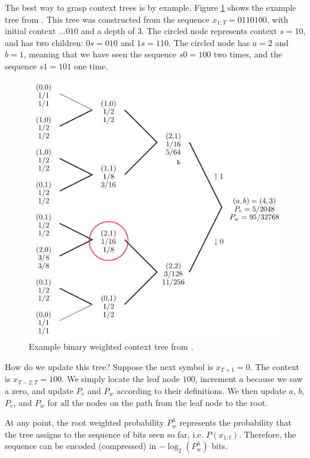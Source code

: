 \documentclass[11pt]{scrartcl}
\begin{document}
The best way to grasp context trees is by example. Figure \ref{fig:bin-tree}
shows the example tree from \textcite{eidma}. This tree was constructed from
the sequence $x_{1:T} = 0110100$, with initial context $...010$ and a depth of
3.  The circled node represents context $s = 10$, and has two children: $0s =
010$ and $1s = 110$. The circled node has $a = 2$ and $b = 1$, meaning that we
have seen the sequence $s0 = 100$ two times, and the sequence $s1 = 101$ one
time.

\begin{figure}[h!]
    \centering
    \includegraphics[width=12cm]{eidma-fig-3-2-ed.png}
    \caption{Example binary weighted context tree from \textcite{eidma}.}
    \label{fig:bin-tree}
\end{figure}

How do we update this tree? Suppose the next symbol is $x_{T+1} = 0$. The
context is $x_{T-2:T} = 100$. We simply locate the leaf node $100$, increment
$a$ because we saw a zero, and update $P_e$ and $P_w$ according to their
definitions. We then update $a$, $b$, $P_e$, and $P_w$ for all the nodes on the
path from the leaf node to the root.

At any point, the root weighted probability $P_w^\lambda$ represents the
probability that the tree assigns to the sequence of bits seen so far, i.e.
$P(x_{1:t})$. Therefore, the sequence can be encoded (compressed) in
$-\log_2(P_w^\lambda)$ bits.
\end{document}
